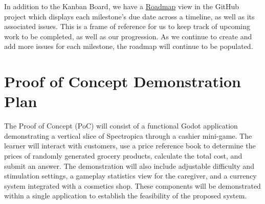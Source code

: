 \documentclass{article}
\begin{document}
In addition to the Kanban Board, we have a \href{https://github.com/users/meena-alomran/projects/5/views/8}
{Roadmap} view in the GitHub project which displays each milestone's due date across a timeline,
as well as its associated issues. This is a frame of reference for us to keep track of upcoming work to be completed,
as well as our progression. As we continue to create and add more issues for each milestone, the roadmap
will continue to be populated.

\section{Proof of Concept Demonstration Plan}

The Proof of Concept (PoC) will consist of a functional Godot application demonstrating a vertical slice of Spectropica through a cashier mini-game. The learner will interact with customers, use a price reference book to determine the prices of randomly generated grocery products, calculate the total cost, and submit an answer. The demonstration will also include adjustable difficulty and stimulation settings, a gameplay statistics view for the caregiver, and a currency system integrated with a cosmetics shop. These components will be demonstrated within a single application to establish the feasibility of the proposed system.
\end{document}
